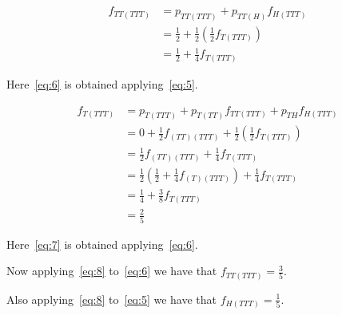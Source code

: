 \documentclass[12pt, a4paper]{article}
\begin{document}
\begin{subequations}
  \begin{align}
    f_{TT(TTT)} &= p_{TT(TTT)} + p_{TT(H)} f_{H(TTT)}\\
                &= \frac{1}{2} + \frac{1}{2} (\frac{1}{2}f_{T(TTT)}) \\
                &= \frac{1}{2} + \frac{1}{4} f_{T(TTT)}\label{eq:6}
  \end{align}
\end{subequations}

Here~\ref{eq:6} is obtained applying~\ref{eq:5}.


\begin{subequations}
  \begin{align}
    f_{T(TTT)} &= p_{T(TTT)} + p_{T(TT)} f_{TT(TTT)} + p_{TH}f_{H(TTT)}\\
               &= 0 + \frac{1}{2} f_{(TT)(TTT)} + \frac{1}{2} (\frac{1}{2}f_{T(TTT)}) \\
               &= \frac{1}{2} f_{(TT)(TTT)} + \frac{1}{4}f_{T(TTT)}\\
               &= \frac{1}{2} (\frac{1}{2} + \frac{1}{4}f_{(T)(TTT)}) + \frac{1}{4}f_{T(TTT)}\label{eq:7}\\
               &= \frac{1}{4} + \frac{3}{8} f_{T(TTT)}\\
               &= \frac{2}{5}\label{eq:8}
  \end{align}
\end{subequations}

Here~\ref{eq:7} is obtained applying~\ref{eq:6}.

Now applying~\ref{eq:8} to~\ref{eq:6} we have that $f_{TT(TTT)} = \frac{3}{5}$.

Also applying~\ref{eq:8} to~\ref{eq:5} we have that $f_{H(TTT)} = \frac{1}{5}$.

\section{}
\subsection{}
\end{document}
